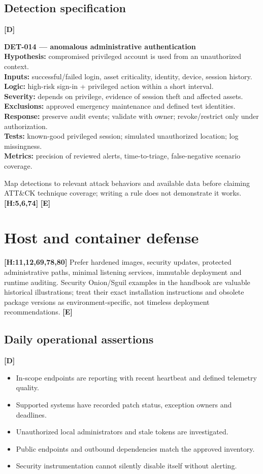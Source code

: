 \documentclass[10pt,letterpaper,oneside]{article}
\newcommand{\handbookref}[1]{\textsf{\color{accent}\textbf{[H:#1]}}}
\newcommand{\modernext}{\textsf{\color{muted}\textbf{[E]}}}
\newcommand{\designed}{\textsf{\color{accent}\textbf{[D]}}}
\begin{document}
\subsection{Detection specification}\designed{}
\begin{warningbox}\textbf{DET-014 --- anomalous administrative authentication}\\
\textbf{Hypothesis:} compromised privileged account is used from an unauthorized context.\\
\textbf{Inputs:} successful/failed login, asset criticality, identity, device, session history.\\
\textbf{Logic:} high-risk sign-in + privileged action within a short interval.\\
\textbf{Severity:} depends on privilege, evidence of session theft and affected assets.\\
\textbf{Exclusions:} approved emergency maintenance and defined test identities.\\
\textbf{Response:} preserve audit events; validate with owner; revoke/restrict only under authorization.\\
\textbf{Tests:} known-good privileged session; simulated unauthorized location; log missingness.\\
\textbf{Metrics:} precision of reviewed alerts, time-to-triage, false-negative scenario coverage.
\end{warningbox}
Map detections to relevant attack behaviors and available data before claiming ATT\&CK technique coverage; writing a rule does not demonstrate it works. \handbookref{5,6,74} \modernext{}

\section{Host and container defense}
\handbookref{11,12,69,78,80} Prefer hardened images, security updates, protected administrative paths, minimal listening services, immutable deployment and runtime auditing. Security Onion/Sguil examples in the handbook are valuable historical illustrations; treat their exact installation instructions and obsolete package versions as environment-specific, not timeless deployment recommendations. \modernext{}
\subsection{Daily operational assertions}\designed{}
\begin{itemize}
\item In-scope endpoints are reporting with recent heartbeat and defined telemetry quality.
\item Supported systems have recorded patch status, exception owners and deadlines.
\item Unauthorized local administrators and stale tokens are investigated.
\item Public endpoints and outbound dependencies match the approved inventory.
\item Security instrumentation cannot silently disable itself without alerting.
\end{itemize}
\end{document}
